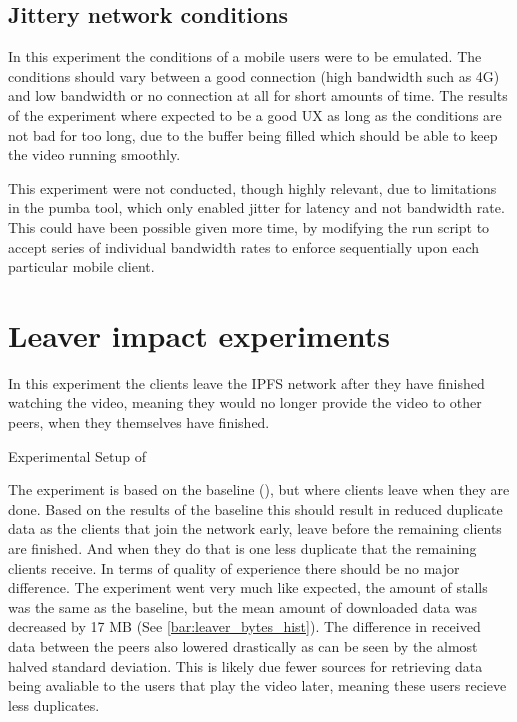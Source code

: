 


\subsection{Jittery network conditions}
In this experiment the conditions of a mobile users were to be emulated. The conditions should vary between a good connection (high bandwidth such as 4G) and low bandwidth or no connection at all for short amounts of time.
The results of the experiment where expected to be a good \ac{UX} as long as the conditions are not bad for too long, due to the buffer being filled which should be able to keep the video running smoothly.

This experiment were not conducted, though highly relevant, due to limitations in the pumba tool, which only enabled jitter for latency and not bandwidth rate.
This could have been possible given more time, \eg by modifying the run script to accept series of individual bandwidth rates to enforce sequentially upon each particular mobile client.

\FloatBarrier \section{Leaver impact experiments} %
\label{sec:eval_leaver}
In this experiment the clients  leave the \ac{IPFS} network after they have finished watching the video, meaning they would no longer provide the video to other peers, when they themselves have finished.

\begin{table}[!htbp]
    \myfloatalign
    \caption[Experimental Setup of Leaver]{Experimental Setup of }
    \label{tab:exp_overview_leaver}
    
\end{table}

The experiment is based on the baseline (), but where clients leave when they are done. Based on the results of the baseline this should result in reduced duplicate data as the clients that join the network early, leave before the remaining clients are finished. And when they do that is one less duplicate that the remaining clients receive. In terms of quality of experience there should be no major difference.
The experiment went very much like expected, the amount of stalls was the same as the baseline, but the mean amount of downloaded data was decreased by 17 \ac{MB} (See \autoref{bar:leaver_bytes_hist}). The difference in received data between the peers also lowered drastically as can be seen by the almost halved standard deviation. This is likely due fewer sources for retrieving data being avaliable to the users that play the video later, meaning these users recieve less duplicates.

